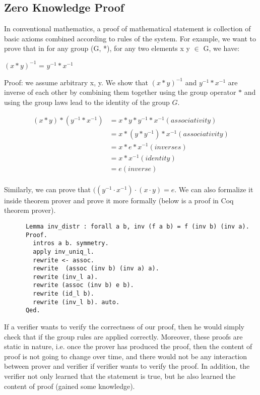\begin{enumerate}
     \subsection{Zero Knowledge Proof}
     \label{sec:zkp}
      In conventional mathematics, a proof of mathematical statement is collection of basic axioms combined according to rules of 
      the system. For example, we want to prove that in for any group (G, *), for any two elements x y $\in$ G, we have:
      \begin{displayquote}
		 
		 $(x * y)^{-1}$ = $y^{-1} * x^{-1}$
		
	    \end{displayquote}
      
      \noindent
      Proof: we assume arbitrary x, y. We show that $(x * y)^{-1}$ and $y^{-1} * x^{-1}$ are 
      inverse of each other by combining them together using the group operator $*$ and using 
      the group laws lead to the identity of the group $G$.
 
 \begin{align}
(x * y) * (y^{-1} * x^{-1})&=  x * y * y^{-1} * x^{-1}  (associativity) \nonumber \\
                     &= x * (y * y^{-1}) * x^{-1}   (associativity) \nonumber \\
                     &= x * e  * x^{-1} (inverses) \nonumber \\
                     &=  x  * x^{-1} (identity)   \nonumber \\
                     &= e (inverse) \nonumber \\
\end{align}

     \noindent
      Similarly, we can prove that $((y^{-1} \cdot x^{-1}) \cdot   (x \cdot y) = e $.
      We can also formalize it inside theorem prover and prove it more formally (below is a proof in Coq theorem prover).
      
      \begin{verbatim}
      Lemma inv_distr : forall a b, inv (f a b) = f (inv b) (inv a).
      Proof.
        intros a b. symmetry. 
        apply inv_uniq_l.
        rewrite <- assoc.
        rewrite  (assoc (inv b) (inv a) a).
        rewrite (inv_l a).
        rewrite (assoc (inv b) e b).
        rewrite (id_l b).
        rewrite (inv_l b). auto.
      Qed.
      \end{verbatim}
     
     If a verifier wants to verify the correctness of our proof, then he would simply check that if the group rules are applied correctly. 
     Moreover, these proofs 
     are static in nature, i.e. once the prover has produced the proof, then the content of proof is not going to change over time, and
     there would not be any interaction between prover and verifier if verifier wants to verify the proof.  In addition, the verifier 
     not only learned that the statement is true, but he also learned the content of proof (gained some knowledge).
     

\end{enumerate}
